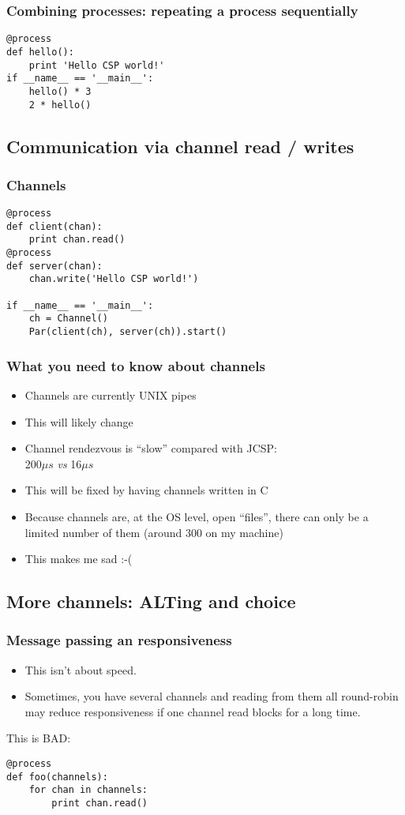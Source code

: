 \documentclass{beamer}
\begin{document}
\begin{frame}[fragile]
  \frametitle{Combining processes: repeating a process sequentially}
  \begin{lstlisting}[language=python_new]
@process
def hello():
    print 'Hello CSP world!'
if __name__ == '__main__':
    hello() * 3
    2 * hello()
  \end{lstlisting}
\end{frame}


\subsection{Communication via channel read / writes}

\begin{frame}[fragile]
  \frametitle{Channels}
  \begin{lstlisting}[language=python_new]
@process
def client(chan):
    print chan.read()
@process
def server(chan):
    chan.write('Hello CSP world!')

if __name__ == '__main__':
    ch = Channel()
    Par(client(ch), server(ch)).start()
  \end{lstlisting}
\end{frame}


\frame
{
  \frametitle{What you need to know about channels}

  \begin{itemize}
  \item Channels are currently UNIX pipes
  \item This will likely change
  \item Channel rendezvous is ``slow'' compared with JCSP:\\
    200$\mu{}s$ \emph{vs} 16$\mu{}s$
  \item This will be fixed by having channels written in C
  \item Because channels are, at the OS level, open ``files'', there
    can only be a limited number of them (around $300$ on my machine)
  \item This makes me sad :-(
  \end{itemize}
}

\subsection{More channels: ALTing and choice}

\begin{frame}[fragile]
  \frametitle{Message passing an responsiveness}

  \begin{itemize}
  \item This isn't about speed.
  \item Sometimes, you have several channels and reading from them all
    round-robin may reduce responsiveness if one channel read blocks
    for a long time.
  \end{itemize}
This is BAD:
  \begin{lstlisting}[language=python_new]
@process
def foo(channels):
    for chan in channels:
        print chan.read()
  \end{lstlisting}
\end{frame}
\end{document}
